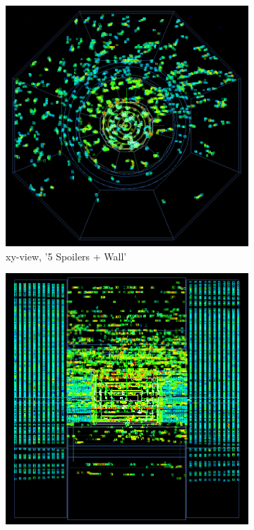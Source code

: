 \begin{figure}
    \centering
    \begin{subfigure}[b]{0.49\textwidth}
    \begin{center}
        \includegraphics[height=0.3\textheight]{figures/muons_positron_5spoilers_wall_515_xyview_croped.png}
        \caption{xy-view, '5 Spoilers + Wall'}
	\label{fig:xy_5SpoilersWall}
    \end{center}
    \end{subfigure}
    \begin{subfigure}[b]{0.49\textwidth}
    \begin{center}
        \includegraphics[height=0.3\textheight]{figures/muons_positron_5spoilers_wall_515_zyview_croped.png}

\end{center}
\end{subfigure}
\end{figure}
